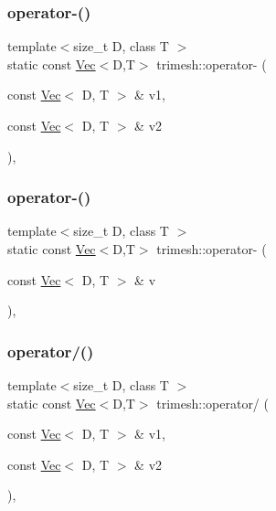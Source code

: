 \subsubsection{\texorpdfstring{operator-\/()}{operator-()}\hspace{0.1cm}{\footnotesize\ttfamily [3/4]}}
{\footnotesize\ttfamily template$<$size\+\_\+t D, class T $>$ \\
static const \hyperlink{classtrimesh_1_1Vec}{Vec}$<$D,T$>$ trimesh\+::operator-\/ (\begin{DoxyParamCaption}\item[{const \hyperlink{classtrimesh_1_1Vec}{Vec}$<$ D, T $>$ \&}]{v1,  }\item[{const \hyperlink{classtrimesh_1_1Vec}{Vec}$<$ D, T $>$ \&}]{v2 }\end{DoxyParamCaption})\hspace{0.3cm}{\ttfamily [inline]}, {\ttfamily [static]}}

\mbox{\label{namespacetrimesh_a6750bfd83e16d752cbfcfda73ddeaead}} 
\subsubsection{\texorpdfstring{operator-\/()}{operator-()}\hspace{0.1cm}{\footnotesize\ttfamily [4/4]}}
{\footnotesize\ttfamily template$<$size\+\_\+t D, class T $>$ \\
static const \hyperlink{classtrimesh_1_1Vec}{Vec}$<$D,T$>$ trimesh\+::operator-\/ (\begin{DoxyParamCaption}\item[{const \hyperlink{classtrimesh_1_1Vec}{Vec}$<$ D, T $>$ \&}]{v }\end{DoxyParamCaption})\hspace{0.3cm}{\ttfamily [inline]}, {\ttfamily [static]}}

\mbox{\label{namespacetrimesh_a7fec5a52883c434a9d499c197d21f03d}} 
\subsubsection{\texorpdfstring{operator/()}{operator/()}}
{\footnotesize\ttfamily template$<$size\+\_\+t D, class T $>$ \\
static const \hyperlink{classtrimesh_1_1Vec}{Vec}$<$D,T$>$ trimesh\+::operator/ (\begin{DoxyParamCaption}\item[{const \hyperlink{classtrimesh_1_1Vec}{Vec}$<$ D, T $>$ \&}]{v1,  }\item[{const \hyperlink{classtrimesh_1_1Vec}{Vec}$<$ D, T $>$ \&}]{v2 }\end{DoxyParamCaption})\hspace{0.3cm}{\ttfamily [inline]}, {\ttfamily [static]}}

